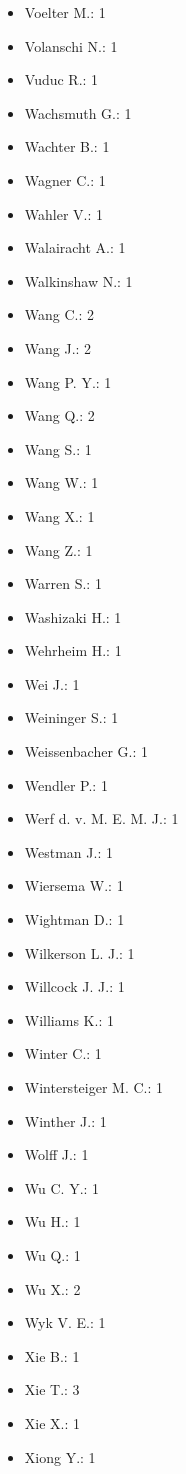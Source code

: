 \begin{itemize}
\item Voelter M.: 1
\item Volanschi N.: 1
\item Vuduc R.: 1
\item Wachsmuth G.: 1
\item Wachter B.: 1
\item Wagner C.: 1
\item Wahler V.: 1
\item Walairacht A.: 1
\item Walkinshaw N.: 1
\item Wang C.: 2
\item Wang J.: 2
\item Wang P. Y.: 1
\item Wang Q.: 2
\item Wang S.: 1
\item Wang W.: 1
\item Wang X.: 1
\item Wang Z.: 1
\item Warren S.: 1
\item Washizaki H.: 1
\item Wehrheim H.: 1
\item Wei J.: 1
\item Weininger S.: 1
\item Weissenbacher G.: 1
\item Wendler P.: 1
\item Werf d. v. M. E. M. J.: 1
\item Westman J.: 1
\item Wiersema W.: 1
\item Wightman D.: 1
\item Wilkerson L. J.: 1
\item Willcock J. J.: 1
\item Williams K.: 1
\item Winter C.: 1
\item Wintersteiger M. C.: 1
\item Winther J.: 1
\item Wolff J.: 1
\item Wu C. Y.: 1
\item Wu H.: 1
\item Wu Q.: 1
\item Wu X.: 2
\item Wyk V. E.: 1
\item Xie B.: 1
\item Xie T.: 3
\item Xie X.: 1
\item Xiong Y.: 1

\end{itemize}
